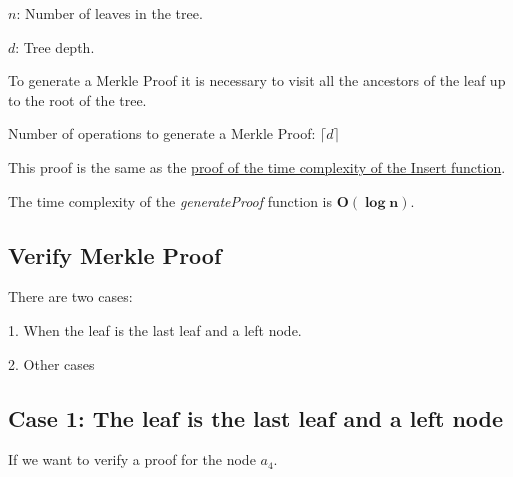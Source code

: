 \documentclass{article}
\begin{document}
\bigbreak

$n$: Number of leaves in the tree.

$d$: Tree depth.

\bigbreak

To generate a Merkle Proof it is necessary to visit all the ancestors of the leaf up to the root of the tree.

\bigbreak

Number of operations to generate a Merkle Proof: $\lceil d \rceil$

This proof is the same as the \hyperref[InsertProof]{proof of the time complexity of the Insert function}.

The time complexity of the \textit{generateProof} function is $\boldsymbol{O(\log n)}$.

\bigbreak

\subsection{Verify Merkle Proof}

There are two cases:

1. When the leaf is the last leaf and a left node.

2. Other cases

\bigbreak

\subsection*{Case 1: The leaf is the last leaf and a left node}

\bigbreak

If we want to verify a proof for the node $a_4$.

\bigbreak
\end{document}

